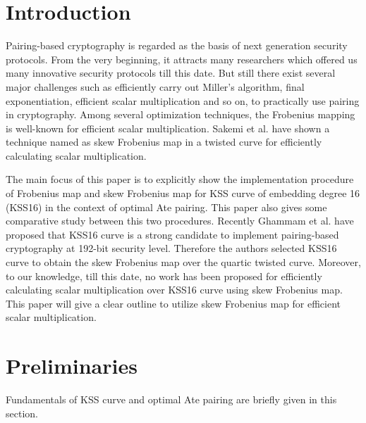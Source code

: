 \section{Introduction}
Pairing-based cryptography is regarded as the basis of next generation security protocols. From the very beginning, it attracts many researchers which offered us many innovative security protocols till this date. 
But still there exist several major challenges such as efficiently carry out Miller's algorithm, final exponentiation, efficient scalar multiplication and so on, to practically use pairing in cryptography. Among several optimization techniques,  the Frobenius mapping is well-known for efficient scalar multiplication. Sakemi et al. \cite{CANS:SNOKM08} have shown a technique named as skew Frobenius map in a twisted curve for efficiently calculating scalar multiplication.

The main focus of this paper is to explicitly show the implementation procedure of  Frobenius map and skew Frobenius map for KSS curve of embedding degree 16 (KSS16) in the context of optimal Ate pairing. This paper also gives some comparative study between this two procedures. Recently Ghammam et al. \cite{EPRINT:GhaFou16b} have proposed that KSS16 curve is a strong candidate to implement pairing-based cryptography at 192-bit security level. Therefore the authors selected KSS16 curve to obtain the skew Frobenius map over the quartic twisted curve. Moreover, to our knowledge, till this date, no work has been proposed for efficiently calculating scalar multiplication over KSS16 curve using skew Frobenius map. This paper will give a clear outline to utilize skew Frobenius map for efficient scalar multiplication.

\section{Preliminaries}
Fundamentals of KSS curve and  optimal Ate pairing are briefly given in this section.
